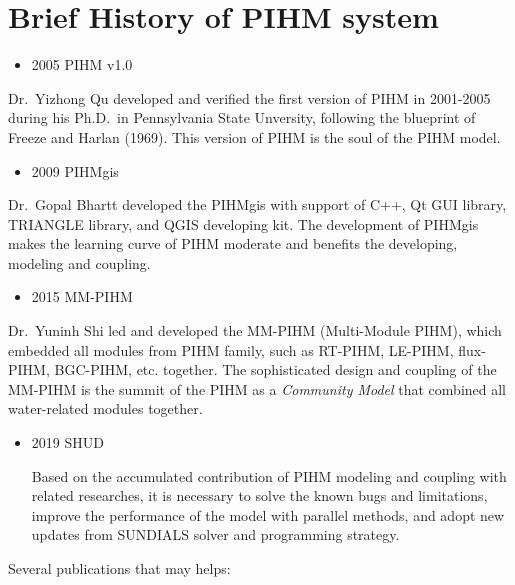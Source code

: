 \documentclass[
]{scrbook}
\providecommand{\tightlist}{%
  \setlength{\itemsep}{0pt}\setlength{\parskip}{0pt}}
\begin{document}
\hypertarget{brief-history-of-pihm-system}{%
\section{Brief History of PIHM system}\label{brief-history-of-pihm-system}}

\begin{itemize}
\tightlist
\item
  2005 PIHM v1.0
\end{itemize}

Dr.~Yizhong Qu \citep{Qu2007} developed and verified the first version of PIHM in 2001-2005 during his Ph.D.~in Pennsylvania State Unversity, following the blueprint of Freeze and Harlan (1969). This version of PIHM is the soul of the PIHM model.

\begin{itemize}
\tightlist
\item
  2009 PIHMgis
\end{itemize}

Dr.~Gopal Bhartt \citep{Bhatt2012} developed the PIHMgis with support of C++, Qt GUI library, TRIANGLE library, and QGIS developing kit. The development of PIHMgis makes the learning curve of PIHM moderate and benefits the developing, modeling and coupling.

\begin{itemize}
\tightlist
\item
  2015 MM-PIHM
\end{itemize}

Dr.~Yuninh Shi led and developed the MM-PIHM (Multi-Module PIHM), which embedded all modules from PIHM family, such as RT-PIHM, LE-PIHM, flux-PIHM, BGC-PIHM, etc. together. The sophisticated design and coupling of the MM-PIHM is the summit of the PIHM as a \emph{Community Model} that combined all water-related modules together.

\begin{itemize}
\item
  2019 SHUD

  Based on the accumulated contribution of PIHM modeling and coupling with related researches, it is necessary to solve the known bugs and limitations,
  improve the performance of the model with parallel methods, and adopt new updates from SUNDIALS solver and programming strategy.
\end{itemize}

Several publications that may helps:
\end{document}
